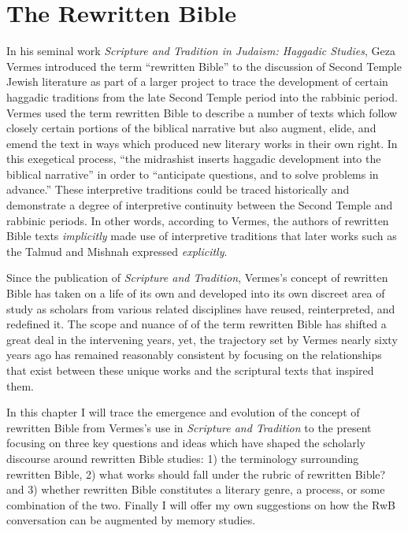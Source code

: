 \hypertarget{the-rwb}{%
\chapter{The Rewritten Bible}\label{the-rwb}}

In his seminal work
\emph{Scripture and Tradition in Judaism: Haggadic Studies}, Geza Vermes
introduced the term ``rewritten Bible'' to the discussion of
Second Temple Jewish literature as part of a larger project to trace the
development of certain haggadic traditions from the late Second Temple
period into the rabbinic period. Vermes used the term rewritten Bible to
describe a number of texts which follow closely certain portions of the
biblical narrative but also augment, elide, and emend the text in ways
which produced new literary works in their own right. In this exegetical
process, ``the midrashist inserts haggadic development into the biblical
narrative'' in order to ``anticipate questions, and to solve problems in
advance.''\autocites[95]{vermes1961}[see also][]{vermes_zsengeller2014}
These interpretive traditions could be traced historically and
demonstrate a degree of interpretive continuity between the
Second Temple and rabbinic periods. In other words, according to Vermes,
the authors of rewritten Bible texts \emph{implicitly} made use of
interpretive traditions that later works such as the Talmud and Mishnah
expressed \emph{explicitly}.

Since the publication of \emph{Scripture and Tradition}, Vermes's
concept of rewritten Bible has taken on a life of its own and developed
into its own discreet area of study as scholars from various related
disciplines have reused, reinterpreted, and redefined it. The scope and
nuance of of the term rewritten Bible has shifted a great deal in the
intervening years, yet, the trajectory set by Vermes nearly sixty years
ago has remained reasonably consistent by focusing on the relationships
that exist between these unique works and the scriptural texts that
inspired them.

In this chapter I will trace the emergence and evolution of the concept
of rewritten Bible from Vermes's use in \emph{Scripture and Tradition}
to the present focusing on three key questions and ideas which have
shaped the scholarly discourse around rewritten Bible studies: 1) the
terminology surrounding rewritten Bible, 2) what works should fall under
the rubric of rewritten Bible? and 3) whether rewritten Bible
constitutes a literary genre, a process, or some combination of the two.
Finally I will offer my own suggestions on how the RwB conversation can
be augmented by memory studies.

